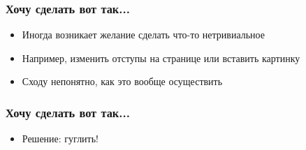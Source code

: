 
\begin{frame}

\frametitle{Хочу сделать вот так...}

\begin{itemize}
    \item Иногда возникает желание сделать что-то нетривиальное
    \item Например, изменить отступы на странице или вставить картинку
    \item Сходу непонятно, как это вообще осуществить
\end{itemize}

\end{frame}


\begin{frame}

\frametitle{Хочу сделать вот так...}

\begin{itemize}
    \item Решение: гуглить! \pause
\end{itemize}

{

\captionsetup[subfloat]{labelformat=empty}

\begin{figure}
  \centering
  \quad
\end{figure}

}

\end{frame}
